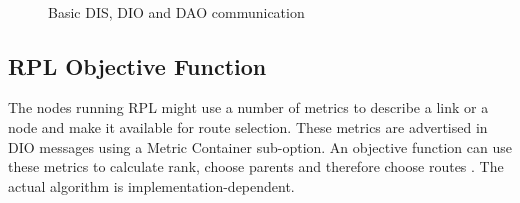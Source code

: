 \begin{figure}[htbp]
  \begin{center}
    \leavevmode
    \\
    \caption{Basic DIS, DIO and DAO communication}
    \label{fig:DIS/DIO/DAO}
  \end{center}
\end{figure}

\subsection{RPL Objective Function}
\label{RPL:OF}
The nodes running RPL might use a number of metrics to describe a link or a node and make it available for route selection. These metrics are advertised in DIO messages using a Metric Container sub-option. An objective function can use these metrics to calculate rank, choose parents and therefore choose routes \cite{MRHOF}. The actual algorithm is implementation-dependent.

